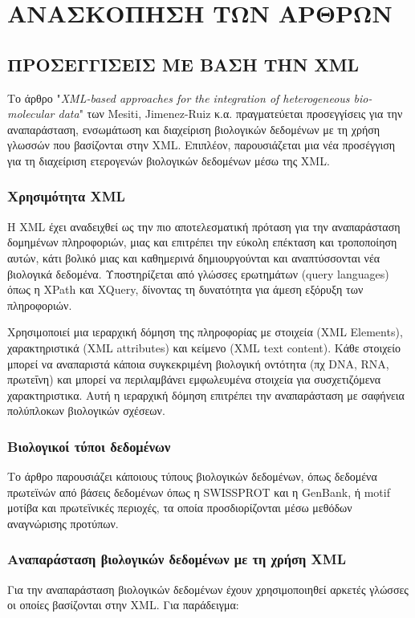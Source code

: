\chapter{ΑΝΑΣΚΟΠΗΣΗ ΤΩΝ ΑΡΘΡΩΝ}

\section{ΠΡΟΣΕΓΓΙΣΕΙΣ ΜΕ ΒΑΣΗ ΤΗΝ XML}
    Το άρθρο "\textit{XML-based approaches for the integration of heterogeneous bio-molecular data}" των Mesiti, Jimenez-Ruiz κ.α. πραγματεύεται προσεγγίσεις για την αναπαράσταση, ενσωμάτωση και διαχείριση βιολογικών δεδομένων με τη χρήση γλωσσών που βασίζονται στην XML.
    Επιπλέον, παρουσιάζεται μια νέα προσέγγιση για τη διαχείριση ετερογενών βιολογικών δεδομένων μέσω της XML. \cite{XMLbasedApproaches}
    
    \subsection{Χρησιμότητα XML}
        Η XML έχει αναδειχθεί ως την πιο αποτελεσματική πρόταση για την αναπαράσταση δομημένων πληροφοριών, μιας και επιτρέπει την εύκολη επέκταση και τροποποίηση αυτών, κάτι βολικό μιας και καθημερινά δημιουργούνται και αναπτύσσονται νέα βιολογικά δεδομένα.
        Υποστηρίζεται από γλώσσες ερωτημάτων (query languages) όπως η XPath και XQuery, δίνοντας τη δυνατότητα για άμεση εξόρυξη των πληροφοριών.

        Χρησιμοποιεί μια ιεραρχική δόμηση της πληροφορίας με στοιχεία (XML Elements), χαρακτηριστικά (XML attributes) και κείμενο (XML text content).
        Κάθε στοιχείο μπορεί να αναπαριστά κάποια συγκεκριμένη βιολογική οντότητα (πχ DNA, RNA, πρωτεΐνη) και μπορεί να περιλαμβάνει εμφωλευμένα στοιχεία για συσχετιζόμενα χαρακτηριστικα.
        Αυτή η ιεραρχική δόμηση επιτρέπει την αναπαράσταση με σαφήνεια πολύπλοκων βιολογικών σχέσεων.


    \subsection{Βιολογικοί τύποι δεδομένων}
        Το άρθρο παρουσιάζει κάποιους τύπους βιολογικών δεδομένων, όπως δεδομένα πρωτεϊνών από βάσεις δεδομένων όπως η SWISSPROT και η GenBank, ή motif μοτίβα και πρωτεϊνικές περιοχές, τα οποία προσδιορίζονται μέσω μεθόδων αναγνώρισης προτύπων.

    \subsection{Αναπαράσταση βιολογικών δεδομένων με τη χρήση XML}
        Για την αναπαράσταση βιολογικών δεδομένων έχουν χρησιμοποιηθεί αρκετές γλώσσες οι οποίες βασίζονται στην XML. Για παράδειγμα:

